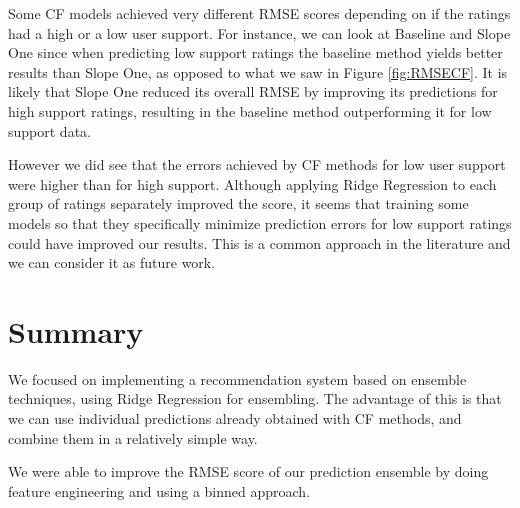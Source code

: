 \documentclass[10pt,conference,compsocconf]{IEEEtran}
\begin{document}
  Some CF models achieved very different RMSE scores depending on if the ratings had a high or a low user support. For instance, we can look at Baseline and Slope One since when predicting low support ratings the baseline method yields better results than Slope One, as opposed to what we saw in Figure  \ref{fig:RMSECF}. It is likely that Slope One reduced its overall RMSE by improving its predictions for high support ratings, resulting in the baseline method outperforming it for low support data.

  However we did see that the errors achieved by CF methods for low user support were higher than for high support. Although applying Ridge Regression to each group of ratings separately improved the score, it seems that training some models so that they specifically minimize prediction errors for low support ratings could have improved our results. This is a common approach in the literature \cite{jahrer2010combining} and we can consider it as future work.


\section{Summary}
\label{sec:tips-writing}
  We focused on implementing a recommendation system based on ensemble techniques, using Ridge Regression for ensembling. The advantage of this is that we can use individual predictions already obtained with CF methods, and combine them in a relatively simple way.

  We were able to improve the RMSE score of our prediction ensemble by doing feature engineering and using a binned approach.



\end{document}
